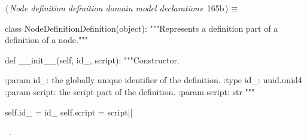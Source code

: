 \documentclass[%
    a4paper,    %
    justified,  %
    nobib,      %
    openany     %
]{tufte-book}
\begin{document}
\begin{flushleft} \small
\begin{minipage}{\linewidth}\label{scrap198}\raggedright\small
{} $\langle\,${\itshape Node definition definition domain model declarations}\nobreak\ {\footnotesize {165b}}$\,\rangle\equiv$
\vspace{-1ex}
\begin{pythoncode}
class NodeDefinitionDefinition(object):
    """Represents a definition part of a definition of a node."""

    def __init__(self, id_, script):
        """Constructor.

        :param id_: the globally unique identifier of the definition.
        :type  id_: uuid.uuid4
        :param script: the script part of the definition.
        :param script: str
        """

        self.id_ = id_
        self.script = script|\NWsep|
\end{pythoncode}
\vspace{1.5ex}
\footnotesize
\begin{list}{}{\setlength{\itemsep}{-\parsep}\setlength{\itemindent}{-\leftmargin}}
\item \NWtxtMacroRefIn\ .

\item{}
\end{list}
\end{minipage}\vspace{4ex}
\end{flushleft}
\end{document}
